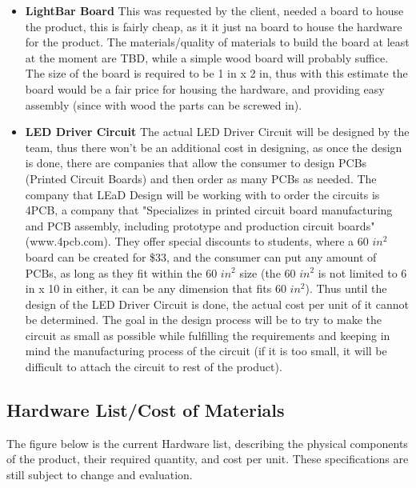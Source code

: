 \documentclass[12pt]{article}
\begin{document}
{{{{{{{{\begin{itemize}
				\item \textbf{LightBar Board}
				This was requested by the client, needed a board to house the product, this is fairly cheap, as it it just na board to house the hardware for the product. The materials/quality of materials to build the board at least at the moment are TBD, while a simple wood board will probably suffice. The size of the board is required to be 1 in x 2 in, thus with this estimate the board would be a fair price for housing the hardware, and providing easy assembly (since with wood the parts can be screwed in).	
				\item \textbf{LED Driver Circuit}
				The actual LED Driver Circuit will be designed by the team, thus there won't be an additional cost in designing, as once the design is done, there are companies that allow the consumer to design PCBs (Printed Circuit Boards) and then order as many PCBs as needed. The company that LEaD Design will be working with to order the circuits is 4PCB, a company that "Specializes in printed circuit board manufacturing and PCB assembly, including prototype and production circuit boards" (www.4pcb.com). They offer special discounts to students, where a 60 $in^2$ board can be created for \$33, and the consumer can put any amount of PCBs, as long as they fit within the 60 $in^2$ size (the 60 $in^2$ is not limited to 6 in x 10 in either, it can be any dimension that fits 60 $in^2$). Thus until the design of the LED Driver Circuit is done, the actual cost per unit of it cannot be determined. The goal in the design process will be to try to make the circuit as small as possible while fulfilling the requirements and keeping in mind the manufacturing process of the circuit (if it is too small, it will be difficult to attach the circuit to rest of the product).
			\end{itemize}
			
			\subsection{Hardware List/Cost of Materials}
			The figure below is the current Hardware list, describing the physical components of the product, their required quantity, and cost per unit. These specifications are still subject to change and evaluation.
			
}}}}}}}}
\end{document}
